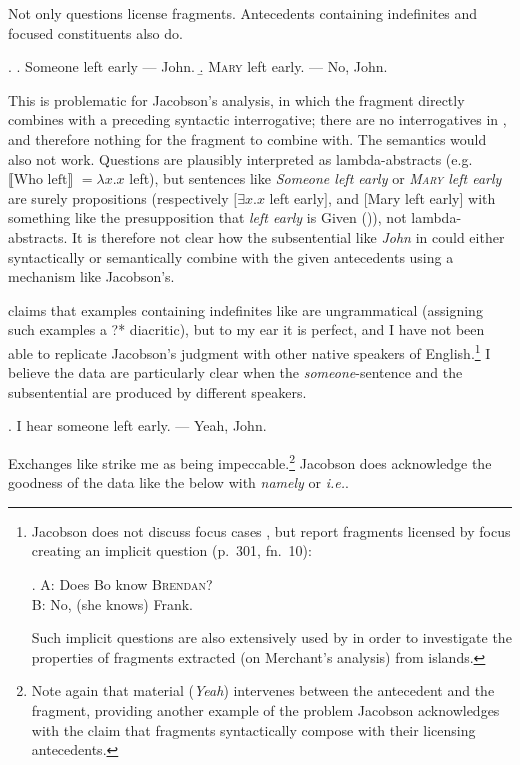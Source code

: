 \documentclass[doublespace]{umthesis}
\newcommand{\ext}[1]{\ensuremath{\llbracket \textrm{{#1}} \rrbracket}}
\begin{document}
Not only questions license fragments. Antecedents containing indefinites and focused constituents also do.

\ex. 		\a. Someone left early --- John.
		\b. \textsc{Mary} left early. --- No, John.

This is problematic for Jacobson's analysis, in which the fragment directly combines with a preceding syntactic interrogative; there are no interrogatives in \Last, and therefore nothing for the fragment to combine with. The semantics would also not work. Questions are plausibly interpreted as lambda-abstracts (e.g. \ext{Who left} $= \lambda x. x$ left), but sentences like {\it Someone left early} or {\it \textsc{Mary} left early} are surely propositions (respectively $[\exists x. x $ left early$]$, and [Mary left early] with something like the presupposition that {\it left early} is Given (\cite{Sc99})), not lambda-abstracts. It is therefore not clear how the subsentential like {\it John} in \Last could either syntactically or semantically combine with the given antecedents using a mechanism like Jacobson's.

\cite{Ja13} claims that examples containing indefinites like \Last[a] are ungrammatical (assigning such examples a ?* diacritic), but to my ear it is perfect, and I have not been able to replicate Jacobson's  judgment with other native speakers of English.\footnote{Jacobson does not discuss focus cases  %
, but \cite{GS00} report fragments licensed by focus creating an implicit question (p.~301, fn.~10):

\ex. A: Does Bo know \textsc{Brendan}?\\
	B: No, (she knows) Frank.
	
Such implicit questions are also extensively used by \cite[687ff.]{Me04} in order to investigate the properties of fragments extracted (on Merchant's analysis) from islands.} I believe the data are particularly clear when the {\it someone}-sentence and the subsentential are produced by different speakers.

\ex. 	I hear someone left early. --- Yeah, John. \label{indefinite-across-speaker}

Exchanges like \Last strike me as being impeccable.\footnote{Note again that material ({\it Yeah}) intervenes between the antecedent and the fragment, providing another example of the problem Jacobson acknowledges with the claim that fragments syntactically compose with their licensing antecedents.} Jacobson does acknowledge the goodness of the data like the below with {\it namely} or {\it i.e.}.
\end{document}
